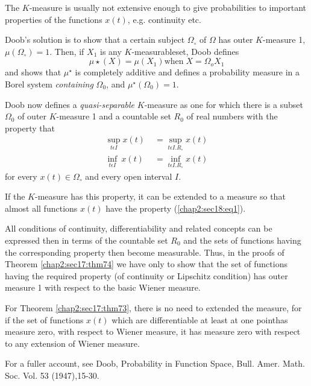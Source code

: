 The $K$-measure is usually not extensive enough to give probabilities
to important properties of the functions $x(t)$, e.g. continuity etc. 

Doob's solution is to show that a certain subject $\Omega_\circ$ of
$\Omega$ has outer $K$-measure 1, $\mu (\Omega_\circ)=1$.  Then, if
$X_1$ is any $K$-measurable\pageoriginale set, Doob defines
$$
\mu \star(X)=\mu(X_1)\text{when}\; X=\Omega_o X_1
$$
and shows that $\mu^\star$ is completely additive and defines a
probability measure in a Borel system \textit{containing} $\Omega_0$, and
$\mu^\star(\Omega_0)=1$.  

Doob now defines a \textit{quasi-separable} $K$-measure as one for
which there is 
a subset $\Omega_0$ of outer $K$-measure 1 and a countable set $R_0$ of
real numbers with the property that 
\begin{align*}
  \sup_{t \epsilon I} x(t)\; & = \sup_{t \epsilon I.R_\circ} x(t)\\
  \inf_{t\epsilon I}~ x(t)& = \inf_{t \epsilon I.R_\circ}
  x(t)\tag{$\alpha$}\label{chap2:sec18:eq1} 
\end{align*}
for every $x(t) \in \Omega_\circ$ and every open interval $I$.

If the $K$-measure has this property, it can be extended to a measure so
that almost all functions $x(t)$ have the property
(\ref{chap2:sec18:eq1}). 

All conditions of continuity, differentiability and related
concepts can be expressed then in terms of the countable set $R_0$ and
the sets of functions having the corresponding property then become
measurable. Thus, in the proofs of Theorem \ref{chap2:sec17:thm74} we have only to show
that the set of functions having the required property (of continuity
or Lipschitz condition) has outer measure 1 with respect to the basic
Wiener measure. 

For Theorem \ref{chap2:sec17:thm73}, there is no need to extended the
measure, for if the 
set of functions $x(t)$ which are differentiable at least at one 
point\pageoriginale has measure zero, with respect to Wiener measure,
it has measure 
zero with respect to any extension of Wiener measure. 
   
   For a fuller account, see Doob, Probability in Function Space,
   Bull. Amer. Math. Soc. Vol. 53 (1947),15-30. 
